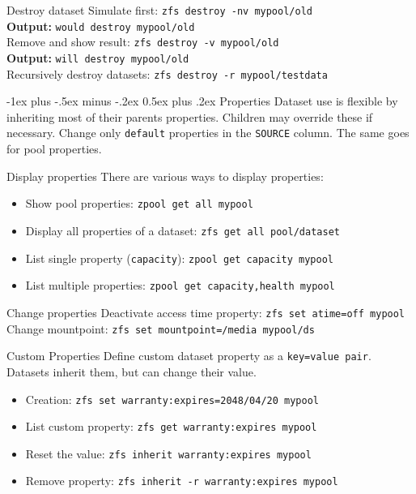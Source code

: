 \documentclass[10pt,landscape,letter]{article}
\makeatletter
\renewcommand{\section}{\@startsection{section}{1}{0mm}%
                                {-1ex plus -.5ex minus -.2ex}%
                                {0.5ex plus .2ex}%
                                {\normalfont\large\bfseries}}
\makeatother
\begin{document}
\begin{multicols}{3}
\begin{Description}
    \item[Destroy dataset] Simulate first: \texttt{zfs destroy -nv mypool/old}\\
      \textbf{Output:} \texttt{would destroy mypool/old}\\
      Remove and show result: \texttt{zfs destroy -v
      mypool/old}\\ \textbf{Output:} \texttt{will destroy
      mypool/old}\\ Recursively destroy datasets:
      \texttt{zfs destroy -r mypool/testdata}
	\end{Description}

	\section{Properties}
  Dataset use is flexible by inheriting most of their parents properties. Children
  may override these if necessary. Change only \texttt{default} properties in the
  \texttt{SOURCE} column. The same goes for pool properties.
	\begin{Description}
    \item[Display properties] There are various ways to display properties:
      \begin{itemize}
        \item Show pool properties: \texttt{zpool get all mypool}
        \item Display all properties of a dataset: \texttt{zfs get all \texttt{pool/dataset}}
        \item List single property (\texttt{capacity}): \texttt{zpool get capacity mypool}
        \item List multiple properties: \texttt{zpool get capacity,health mypool}
      \end{itemize}
    \item[Change properties] Deactivate access time property: \texttt{zfs set atime=off mypool}
      Change mountpoint: \texttt{zfs set mountpoint=/media mypool/ds}

    \item[Custom Properties] Define custom dataset property as a
      \texttt{key=value pair}. Datasets inherit them, but can change their
      value.
      \begin{itemize}
        \item Creation: \texttt{zfs set warranty:expires=2048/04/20 mypool}
      \item List custom property: \texttt{zfs get warranty:expires mypool}
      \item Reset the value: \texttt{zfs inherit warranty:expires mypool}
      \item Remove property: \texttt{zfs inherit -r warranty:expires mypool}
      \end{itemize}
	\end{Description}


\end{multicols}
\end{document}
